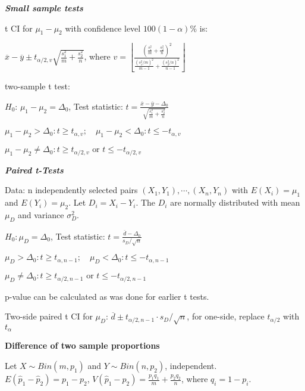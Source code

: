 \documentclass{article}
\newcommand{\bigtitle}[1]{
	\noindent
	\textbf{#1}
}
\newcommand{\smalltitle}[1]{
	\noindent
	\textbf{\textit{#1}}
}
\begin{document}
	\smalltitle{Small sample tests}
	
	t CI for $\mu_1-\mu_2$ with confidence level $100(1-\alpha)\%$ is:
	
	$\overline { x } - \overline { y } \pm t _ { \alpha / 2 , v } \sqrt { \frac { s _ { 1 } ^ { 2 } } { m } + \frac { s _ { 2 } ^ { 2 } } { n } }$, where 
	$v = \left\lfloor \frac { \left( \frac { s _ { 1 } ^ { 2 } } { m } + \frac { s _ { 2 } ^ { 2 } } { n } \right) ^ { 2 } } { \frac { \left( s _ { 1 } ^ { 2 } / m \right) ^ { 2 } } { m - 1 } + \frac { \left( s _ { 2 } ^ { 2 } / n \right) ^ { 2 } } { n - 1 } } \right\rfloor$
	
	two-sample t test:
	
	$H_0$: $\mu_1-\mu_2 = \Delta_0$, Test statistic: $t = \frac { \overline { x } - \overline { y } - \Delta _ { 0 } } { \sqrt { \frac { s _ { 1 } ^ { 2 } } { m } + \frac { s _ { 2 } ^ { 2 } } { n } } }$
	
	
	$
	{\mu_1 - \mu_2 > \Delta_0} : {t\geq t_{\alpha,v}} ;\quad
	{\mu_1 - \mu_2 < \Delta_0} : {t\leq -t_{\alpha,v}}$
	
	$
	{\mu_1 - \mu_2 \neq \Delta_0} : { t\geq t_{\alpha/2,v} \text{ or } t\leq -t_{\alpha/2,v} }
	$
	
	\smalltitle{Paired t-Tests}
	
	Data: n independently selected pairs $(X_1,Y_1),\cdots,(X_n,Y_n)$ with $E(X_i)=\mu_1$ and $E(Y_i)=\mu_2$. Let $D_i = X_i-Y_i$. The $D_i$ are normally distributed with mean $\mu_D$ and variance $\sigma_D^2$.
	
	$H_0:\mu_D = \Delta_0$, Test statistic: $t = \frac { \overline { d } - \Delta _ { 0 } } { s _ { D } / \sqrt { n } }$
	
	
	$
	\mu_D > \Delta_0 : t \geq t_{\alpha,n-1} ;\quad
	\mu_D < \Delta_0 : t \leq -t_{\alpha,n-1} $
	
	$
	\mu_D \neq \Delta_0 :  t\geq t_{\alpha/2,n-1} \text{ or } t \leq -t_{\alpha/2,n-1}
	$
	
	
	p-value can be calculated as was done for earlier t tests.
	
	Two-side paired t CI for $\mu_D$: $\overline { d } \pm t _ { \alpha / 2 , n - 1 } \cdot s _ { D } / \sqrt { n }$, for one-side, replace $t_{\alpha/2}$ with $t_\alpha$
	
	\bigtitle{Difference of two sample proportions}
	
	Let $X \sim Bin(m,p_1) $ and $Y \sim Bin(n,p_2)$, independent.\\
	$E(\hat{p}_1 - \hat{ p }_2) = p_1 - p_2$, $V \left( \hat { p } _ { 1 } - \hat { p } _ { 2 } \right) = \frac { p _ { 1 } q _ { 1 } } { m } + \frac { p _ { 2 } q _ { 2 } } { n }$, where $q _ { i } = 1 - p _ { i }$.
	
\end{document}
